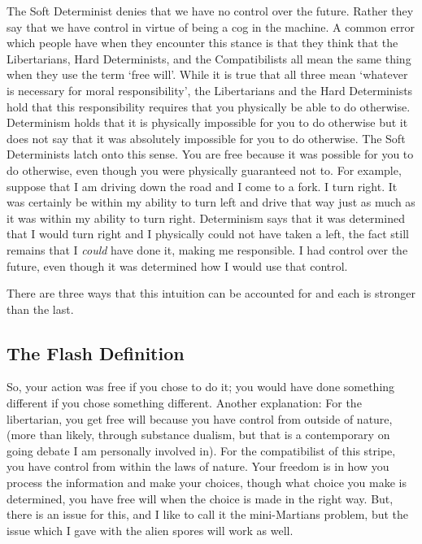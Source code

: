 The Soft Determinist denies that we have no control over the future. Rather they say that we have control in virtue of being a cog in the machine. A common error which people have when they encounter this stance is that they think that the Libertarians, Hard Determinists, and the Compatibilists all mean the same thing when they use the term `free will'. While it is true that all three mean `whatever is necessary for moral responsibility', the Libertarians and the Hard Determinists hold that this responsibility requires that you physically be able to do otherwise. Determinism holds that it is physically impossible for you to do otherwise but it does not say that it was absolutely impossible for you to do otherwise. The Soft Determinists latch onto this sense. You are free because it was possible for you to do otherwise, even though you were physically guaranteed not to. For example, suppose that I am driving down the road and I come to a fork. I turn right. It was certainly be within my ability to turn left and drive that way just as much as it was within my ability to turn right. Determinism says that it was determined that I would turn right and I physically could not have taken a left, the fact still remains that I \emph{could} have done it, making me responsible. I had control over the future, even though it was determined how I would use that control.

There are three ways that this intuition can be accounted for and each is stronger than the last. 

\subsection{The Flash Definition}


So, your action was free if you chose to do it; you would have done something different if you chose something different. Another explanation: For the libertarian, you get free will because you have control from outside of nature,  (more than likely, through substance dualism, but that is a contemporary on going debate I am personally involved in). For the compatibilist of this stripe, you have control from within the laws of nature. Your freedom is in how you process the information and make your choices, though what choice you make is determined, you have free will when the choice is made in the right way. But, there is an issue for this, and I like to call it the mini-Martians problem, but the issue which I gave with the alien spores will work as well. 

